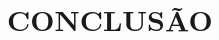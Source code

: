 \chapter{CONCLUSÃO}

\begin{comment}
	

A análise dos dados do simulado utilizando tanto a Teoria Clássica dos Testes (TCT) quanto a Teoria de Resposta ao Item (TRI) permitiu uma compreensão mais aprofundada sobre o desempenho dos participantes e a qualidade dos itens. Na TCT, os resultados indicaram uma distribuição de acertos concentrada em torno da mediana, com uma variação moderada entre os participantes. No entanto, a TCT, ao basear-se apenas no escore bruto, tem limitações para captar nuances importantes da prova, como a dificuldade e discriminação de cada item, bem como a coerência nas respostas dos indivíduos. Nesse sentido, a TRI apresentou-se como uma ferramenta mais robusta, permitindo não apenas a estimativa das habilidades dos participantes em uma escala contínua, mas também oferecendo uma análise detalhada de cada item em termos de dificuldade, discriminação e probabilidade de acerto ao acaso.

Os modelos testados na TRI, especialmente o modelo de três parâmetros logísticos (3PL), mostraram-se adequados para capturar as relações entre o desempenho dos participantes e as características dos itens. O modelo 3PL, que inclui o parâmetro de chute, apresentou o melhor ajuste aos dados, indicando ser o mais apropriado para este simulado, conforme demonstrado pelos testes de adequação (M2, TLI, CFI e RMSEA). Esse modelo permitiu estimar com maior precisão a habilidade dos participantes, diferenciando não apenas o total de acertos, mas a coerência no padrão de respostas, algo que a TCT não contempla.


Os itens com bons índices de discriminação e dificuldade adequada, como os itens 3, 5, 7 e 12, mostraram-se eficazes na diferenciação de participantes com diferentes níveis de habilidade e, portanto, devem ser preservados no banco de itens para futuras aplicações. Esses itens fornecem informações valiosas e contribuem para a precisão das estimativas de habilidade. Por outro lado, os itens 21, 27, 28 e 30, que apresentaram discriminação negativa ou baixa, além de coeficientes bisserial problemáticos, precisam ser revisados ou descartados, pois comprometem a validade e a confiabilidade da avaliação.

Além disso, a análise da curva de informação do teste indicou que a prova foi mais eficaz para discriminar participantes com habilidades abaixo da média, especialmente na faixa entre -2 e -1. No entanto, identificou-se uma lacuna no teste em relação aos participantes com habilidades próximas à média, onde a quantidade de informação foi menor do que o ideal. Para melhorar a precisão da avaliação nesse grupo, seria recomendável a inclusão de itens que ofereçam mais informação nessa faixa central de habilidades. A adição desses itens poderá aumentar a capacidade do teste de discriminar com maior precisão os participantes com habilidades intermediárias, melhorando a qualidade da mensuração global.


\end{comment}
